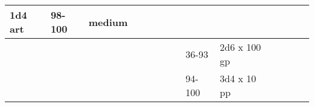 \begin{longtable}{llllllllllllll}
{\begin{minipage}[t]{0.469in}
1d4 art\end{minipage}} & \multicolumn{1}{p{0.626in}|}{\begin{minipage}[t]{0.626in}\raggedright
98-100\end{minipage}} & \multicolumn{1}{p{0.469in}|}{\begin{minipage}[t]{0.469in}\centering
1 medium\end{minipage}}\\
\hline
\multicolumn{8}{p{1.150in}|}{\begin{minipage}[t]{1.150in}\centering
\end{minipage}} & \multicolumn{1}{|p{0.393in}|}{\begin{minipage}[t]{0.393in}\raggedright
36-93\end{minipage}} & \multicolumn{1}{p{0.469in}|}{\begin{minipage}[t]{0.469in}\raggedright
2d6 x 100 gp\end{minipage}} & \multicolumn{1}{p{0.923in}|}{\begin{minipage}[t]{0.923in}\raggedright
\end{minipage}} & \multicolumn{1}{p{0.469in}|}{\begin{minipage}[t]{0.469in}\raggedright
\end{minipage}} & \multicolumn{1}{p{0.626in}|}{\begin{minipage}[t]{0.626in}\raggedright
\end{minipage}} & \multicolumn{1}{p{0.469in}|}{\begin{minipage}[t]{0.469in}\centering
\end{minipage}}\\
\hline
\multicolumn{8}{p{1.150in}|}{\begin{minipage}[t]{1.150in}\centering
\end{minipage}} & \multicolumn{1}{|p{0.393in}|}{\begin{minipage}[t]{0.393in}\raggedright
94-100\end{minipage}} & \multicolumn{1}{p{0.469in}|}{\begin{minipage}[t]{0.469in}\raggedright
3d4 x 10 pp\end{minipage}} & \multicolumn{1}{p{0.923in}|}{\begin{minipage}[t]{0.923in}\raggedright
\end{minipage}} & \multicolumn{1}{p{0.469in}|}{\begin{minipage}[t]{0.469in}\raggedright
\end{minipage}} & \multicolumn{1}{p{0.626in}|}{\begin{minipage}[t]{0.626in}\raggedright

\end{minipage}}
\end{longtable}
